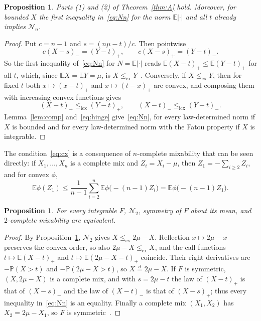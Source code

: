 \documentclass[11pt]{amsart}
\newtheorem{proposition}[theorem]{Proposition}
\theoremstyle{definition}
\newcommand{\Prob}{\mathbb{P}}
\newcommand{\E}{\mathbb{E}}
\newcommand{\cx}{\le_{\mathrm{cx}}}
\newcommand{\icx}{\le_{\mathrm{icx}}}
\newcommand{\eqd}{\stackrel{d}{=}}
\newcommand{\cN}{\mathcal{N}}
\begin{document}
\begin{proposition}\label{prop:red}
Parts (1) and (2) of Theorem~\ref{thm:A} hold. Moreover, for bounded $X$ the first inequality in~\eqref{eq:Nn} for the
norm $\E|\cdot|$ and all $t$ already implies $\cN_n$.
\end{proposition}

\begin{proof}
Put $c=n-1$ and $s=(n\mu-t)/c$. Then pointwise
\begin{equation}\label{eq:hinge}
c(X-s)_-=(Y-t)_+,\qquad c(X-s)_+=(Y-t)_-.
\end{equation}
So the first inequality of~\eqref{eq:Nn} for $N=\E|\cdot|$ reads $\E(X-t)_+\le\E(Y-t)_+$ for all $t$, which, since
$\E X=\E Y=\mu$, is $X\cx Y$~\cite[Theorem~3.A.1]{SS07}. Conversely, if $X\cx Y$, then for fixed $t$ both $x\mapsto(x-t)_+$
and $x\mapsto(t-x)_+$ are convex, and composing them with increasing convex functions gives
\[
(X-t)_+\icx(Y-t)_+,\qquad(X-t)_-\icx(Y-t)_-.
\]
Lemma~\ref{lem:comp} and~\eqref{eq:hinge} give~\eqref{eq:Nn}, for every law-determined norm if $X$ is bounded and
for every law-determined norm with the Fatou property if $X$ is integrable.
\end{proof}

The condition~\eqref{eq:cx} is a consequence of $n$-complete mixability that can be seen directly: if $X_1,\dots,X_n$
is a complete mix and $Z_i=X_i-\mu$, then $Z_1=-\sum_{i\ge2}Z_i$, and for convex $\phi$,
\[
\E\phi(Z_1)\le\frac1{n-1}\sum_{i=2}^n\E\phi\bigl(-(n-1)Z_i\bigr)=\E\phi\bigl(-(n-1)Z_1\bigr).
\]

\begin{proposition}\label{prop:n2}
For every integrable $F$, $\cN_2$, symmetry of $F$ about its mean, and $2$-complete mixability are equivalent.
\end{proposition}

\begin{proof}
By Proposition~\ref{prop:red}, $\cN_2$ gives $X\cx2\mu-X$. Reflection $x\mapsto2\mu-x$ preserves the convex order, so
also $2\mu-X\cx X$, and the call functions $t\mapsto\E(X-t)_+$ and $t\mapsto\E(2\mu-X-t)_+$ coincide. Their right
derivatives are $-\Prob(X>t)$ and $-\Prob(2\mu-X>t)$, so $X\eqd2\mu-X$. If $F$ is symmetric, $(X,2\mu-X)$ is a
complete mix, and with $s=2\mu-t$ the law of $(X-t)_+$ is that of $(X-s)_-$ and the law of $(X-t)_-$ is that of
$(X-s)_+$; thus every inequality in~\eqref{eq:Nn} is an equality. Finally a complete mix $(X_1,X_2)$ has
$X_2=2\mu-X_1$, so $F$ is symmetric~\cite[Proposition~2.3]{WW11}.
\end{proof}
\end{document}
